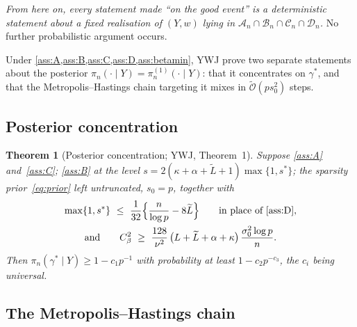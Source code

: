 \documentclass[aos]{imsart}
\newcommand{\Ltil}{\widetilde{L}}
\newcommand{\OO}{\mathcal{O}}  %
\theoremstyle{plain}
\newtheorem{theorem}{Theorem}[section]
\theoremstyle{definition}
\begin{document}
    \emph{From here on, every statement made ``on the good event'' is a
    deterministic statement about a fixed realisation of $(Y,w)$ lying in
        $\mathcal{A}_n\cap\mathcal{B}_n\cap\mathcal{C}_n\cap\mathcal{D}_n$.} No
    further probabilistic argument occurs.



    \label{sec:ywj}

    Under \cref{ass:A,ass:B,ass:C,ass:D,ass:betamin}, YWJ prove two separate
    statements about the
    posterior $\pi_n(\cdot\mid Y)=\pi_n^{(1)}(\cdot\mid Y)$: that
    it concentrates on $\gamma^{\ast}$, and that the Metropolis--Hastings
    chain targeting it mixes in $\tilde{\OO}(ps_0^2)$ steps.

    \subsection{Posterior concentration}
    \label{sub:ywjconc}

    \begin{theorem}[Posterior concentration; YWJ, Theorem~1]
        \label{th:ywj1}
        Suppose \cref{ass:A} and~\cref{ass:C}; \cref{ass:B} at the level
        $s=2(\kappa+\alpha+\Ltil+1)\max\{1,s^{\ast}\}$; the sparsity
        prior~\eqref{eq:prior} left untruncated, $s_0=p$, together with
        \begin{gather*}
            \max\{1,s^{\ast}\}\ \leq\ \frac{1}{32}
            \Bigl\{\frac{n}{\log p}-8\Ltil\Bigr\}
            \qquad\text{in place of \cref{ass:D}},\\
            \text{and}\qquad
            C_\beta^{2}\ \geq\ \frac{128}{\nu^{2}}\,
            \bigl(L+\Ltil+\alpha+\kappa\bigr)\,
            \frac{\sigma_0^{2}\log p}{n} .
        \end{gather*}
        Then $\pi_n(\gamma^{\ast}\mid Y)\geq1-c_1p^{-1}$ with probability at
        least $1-c_2p^{-c_3}$, the $c_i$ being universal.
    \end{theorem}

    \subsection{The Metropolis--Hastings chain}
    \label{sub:kernel}
\end{document}
